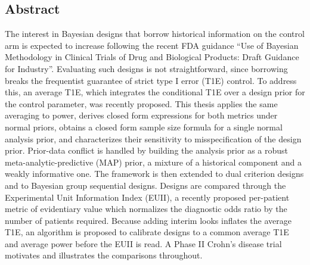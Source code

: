\newpage
\subsection*{Abstract}

The interest in Bayesian designs that borrow historical information on the control arm is expected to increase following the
recent FDA guidance ``Use of Bayesian Methodology in Clinical Trials of Drug and Biological Products: Draft Guidance for Industry''.
Evaluating such designs is not straightforward, since borrowing breaks the frequentist guarantee of strict type I error (T1E) control. To address this,
an average T1E, which integrates the conditional T1E over a design prior for the control parameter, was recently proposed. This thesis
applies the same averaging to power, derives closed form expressions for both metrics under normal priors, obtains a closed form sample size formula
for a single normal analysis prior, and characterizes their sensitivity to misspecification of the design prior.
Prior-data conflict is handled by building the analysis prior as a robust meta-analytic-predictive (MAP) prior,
a mixture of a historical component and a weakly informative one.
The framework is then extended to dual criterion designs and to Bayesian group sequential designs. Designs are
compared through the Experimental Unit Information Index (EUII), a recently proposed per-patient metric
of evidentiary value which normalizes the diagnostic odds ratio
by the number of patients required. 
Because adding interim looks inflates the average T1E, an algorithm is proposed to calibrate designs to a common average T1E
and average power before the EUII is read. A Phase II Crohn's disease trial motivates and illustrates the comparisons throughout.

